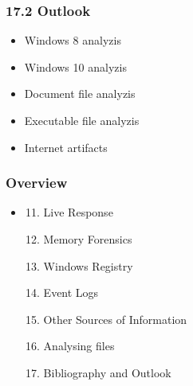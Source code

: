 \begin{frame}
  \frametitle{17.2 Outlook}
  \begin{itemize}
      \item Windows 8 analyzis
      \item Windows 10 analyzis
      \item Document file analyzis
      \item Executable file analyzis
      \item Internet artifacts
  \end{itemize}
\end{frame}


\begin{frame}
  \frametitle{Overview}
  \begin{itemize}
  \item[]
      \begin{enumerate}
          \setcounter{enumi}{10}
          \item Live Response
          \item Memory Forensics
          \item Windows Registry
          \item Event Logs
          \item Other Sources of Information
          \item Analysing files
          \item Bibliography and Outlook
      \end{enumerate}
  \end{itemize}
\end{frame}

